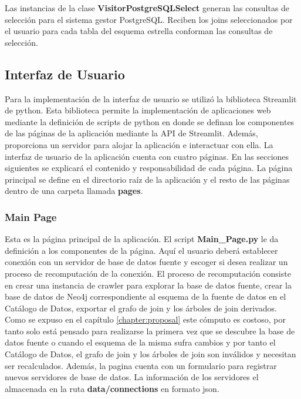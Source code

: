 Las instancias de la clase \textbf{VisitorPostgreSQLSelect} generan las consultas de selección para 
el sistema gestor PostgreSQL. Reciben los joins seleccionados por el usuario para cada tabla del esquema 
estrella conforman las consultas de selección.

\subsection{Interfaz de Usuario}

Para la implementación de la interfaz de usuario se utilizó la biblioteca Streamlit de python. Esta biblioteca 
permite la implementación de aplicaciones web mediante la definición de scripts de python en donde se 
definan los componentes de las páginas de la aplicación mediante la API de Streamlit. Además, proporciona un 
servidor para alojar la aplicación e interactuar con ella. La interfaz de usuario de la aplicación cuenta 
con cuatro páginas. En las secciones siguientes se explicar\'a el contenido y responsabilidad de cada página. 
La página principal se define en el directorio raíz de la aplicación y el resto de las páginas dentro 
de una carpeta llamada \textbf{pages}.

\subsubsection{Main Page}

Esta es la página principal de la aplicación. El script \textbf{Main\_Page.py} le da definición 
a los componentes de la página. Aquí el usuario deber\'a establecer conexión con un servidor de 
base de datos fuente y escoger si desea realizar un proceso de recomputaci\'on de la conexión. El 
proceso de recomputaci\'on consiste en crear una instancia de crawler para explorar la base de datos 
fuente, crear la base de datos de Neo4j correspondiente al esquema de la fuente de datos en el Catálogo 
de Datos, exportar el grafo de join y los \'arboles de join derivados. Como se expuso en el capítulo 
\ref{chapter:proposal} este cómputo es costoso, por tanto solo est\'a pensado para realizarse la primera 
vez que se descubre la base de datos fuente o cuando el esquema de la misma sufra cambios y por tanto 
el Catálogo de Datos, el grafo de join y los \'arboles de join son inválidos y necesitan ser recalculados. 
Además, la pagina cuenta con un formulario para registrar nuevos servidores de base de datos. La información 
de los servidores el almacenada en la ruta \textbf{data/connections} en formato json.

